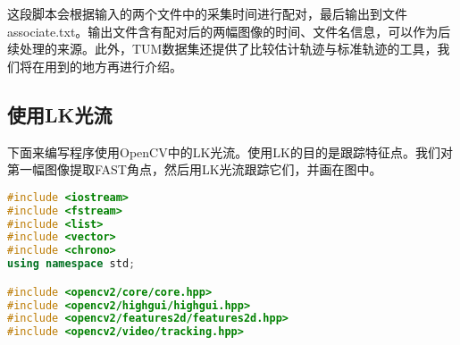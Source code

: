 这段脚本会根据输入的两个文件中的采集时间进行配对，最后输出到文件associate.txt。输出文件含有配对后的两幅图像的时间、文件名信息，可以作为后续处理的来源。此外，TUM数据集还提供了比较估计轨迹与标准轨迹的工具，我们将在用到的地方再进行介绍。

\subsection{使用LK光流}
下面来编写程序使用OpenCV中的LK光流。使用LK的目的是跟踪特征点。我们对第一幅图像提取FAST角点，然后用LK光流跟踪它们，并画在图中。

\begin{lstlisting}[language=c++,caption=slambook/ch8/useLK/useLK.cpp]
#include <iostream>
#include <fstream>
#include <list>
#include <vector>
#include <chrono>
using namespace std; 

#include <opencv2/core/core.hpp>
#include <opencv2/highgui/highgui.hpp>
#include <opencv2/features2d/features2d.hpp>
#include <opencv2/video/tracking.hpp>


\end{lstlisting}
